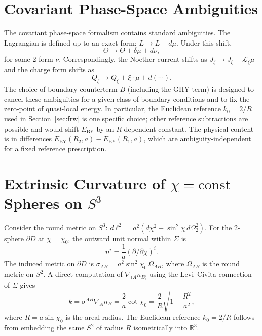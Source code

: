 \documentclass[12pt,a4paper]{article}
\newcommand{\Sig}{\Sigma}           %
\newcommand{\pa}{\partial}          %
\newcommand{\Jxi}{J_\xi}
\newcommand{\Qxi}{Q_\xi}
\newcommand{\EBY}{E_{\mathrm{BY}}}
\begin{document}
\section{Covariant Phase-Space Ambiguities}
\label{app:ambig}

The covariant phase-space formalism contains standard
ambiguities. The Lagrangian is defined up to an exact form:
$L \to L + d\mu$. Under this shift,
\begin{equation}
  \Theta \to \Theta + \delta\mu + d\nu,
  \label{eq:Tshift}
\end{equation}
for some 2-form $\nu$. Correspondingly, the Noether
current shifts as $\Jxi \to \Jxi + \mathcal{L}_\xi\mu$
and the charge form shifts as
\begin{equation}
  \Qxi \to \Qxi + \xi\cdot\mu + d(\cdots).
  \label{eq:Qshift}
\end{equation}
The choice of boundary counterterm $B$ (including the GHY
term) is designed to cancel these ambiguities for a given
class of boundary conditions and to fix the zero-point of
quasi-local energy. In particular, the Euclidean reference
$k_0 = 2/R$ used in Section~\ref{sec:frw} is one specific
choice; other reference subtractions are possible and would
shift $\EBY$ by an $R$-dependent constant. The physical
content is in differences $\EBY(R_2, a) - \EBY(R_1, a)$,
which are ambiguity-independent for a fixed reference
prescription.

\section{Extrinsic Curvature of $\chi = \text{const}$
         Spheres on $S^3$}
\label{app:extcurv}

Consider the round metric on $S^3$:
$d\ell^2 = a^2(d\chi^2 + \sin^2\chi\,d\Omega_2^2)$.
For the 2-sphere $\pa D$ at $\chi = \chi_0$, the outward
unit normal within $\Sig$ is
\begin{equation}
  n^i = \frac{1}{a}(\partial/\partial\chi)^i.
  \label{eq:normal}
\end{equation}
The induced metric on $\pa D$ is
$\sigma_{AB} = a^2\sin^2\chi_0\,\Omega_{AB}$,
where $\Omega_{AB}$ is the round metric on $S^2$.
A direct computation of $\nabla_{(A}n_{B)}$ using the
Levi--Civita connection of $\Sig$ gives
\begin{equation}
  k = \sigma^{AB}\nabla_A n_B
  = \frac{2}{a}\cot\chi_0
  = \frac{2}{R}\sqrt{1 - \frac{R^2}{a^2}},
  \label{eq:kderived}
\end{equation}
where $R = a\sin\chi_0$ is the areal radius. The
Euclidean reference $k_0 = 2/R$ follows from embedding
the same $S^2$ of radius $R$ isometrically into $\mathbb{R}^3$.
\end{document}
